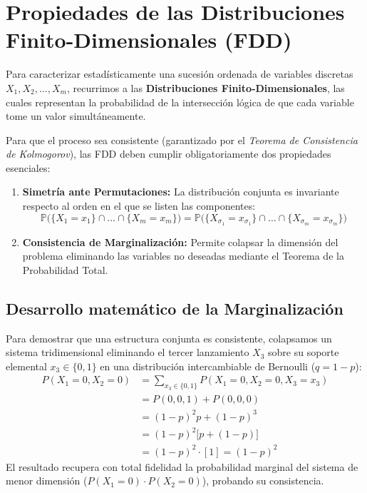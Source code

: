 \documentclass[10pt]{book}
\begin{document}
\section{Propiedades de las Distribuciones Finito-Dimensionales (FDD)}

Para caracterizar estadísticamente una sucesión ordenada de variables discretas $X_1, X_2, \dots, X_m$, recurrimos a las \textbf{Distribuciones Finito-Dimensionales}, las cuales representan la probabilidad de la intersección lógica de que cada variable tome un valor simultáneamente.

Para que el proceso sea consistente (garantizado por el \textit{Teorema de Consistencia de Kolmogorov}), las FDD deben cumplir obligatoriamente dos propiedades esenciales:
\begin{enumerate}
    \item \textbf{Simetría ante Permutaciones:} La distribución conjunta es invariante respecto al orden en el que se listen las componentes:
    \begin{equation*}
        \mathbb{P}\big( \{X_1 = x_1\} \cap \dots \cap \{X_m = x_m\} \big) = \mathbb{P}\big( \{X_{\sigma_1} = x_{\sigma_1}\} \cap \dots \cap \{X_{\sigma_m} = x_{\sigma_m}\} \big)
    \end{equation*}
    \item \textbf{Consistencia de Marginalización:} Permite colapsar la dimensión del problema eliminando las variables no deseadas mediante el Teorema de la Probabilidad Total.
\end{enumerate}

\subsection{Desarrollo matemático de la Marginalización}
Para demostrar que una estructura conjunta es consistente, colapsamos un sistema tridimensional eliminando el tercer lanzamiento $X_3$ sobre su soporte elemental $x_3 \in \{0, 1\}$ en una distribución intercambiable de Bernoulli ($q = 1-p$):
\begin{align*}
    P(X_1 = 0, X_2 = 0) &= \sum_{x_3 \in \{0,1\}} P(X_1 = 0, X_2 = 0, X_3 = x_3) \\
    &= P(0,0,1) + P(0,0,0) \\
    &= (1-p)^2 p + (1-p)^3 \\
    &= (1-p)^2 \big[ p + (1-p) \big] \\
    &= (1-p)^2 \cdot [1] = (1-p)^2
\end{align*}
El resultado recupera con total fidelidad la probabilidad marginal del sistema de menor dimensión ($P(X_1=0) \cdot P(X_2=0)$), probando su consistencia.
\end{document}
